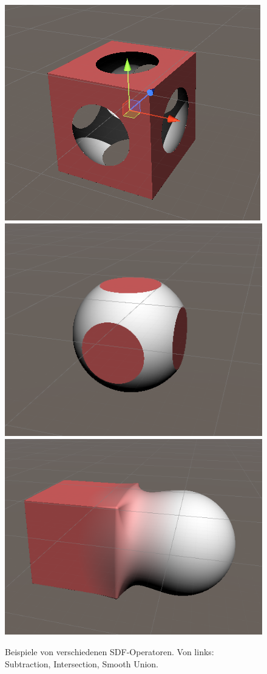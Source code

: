 \begin{figure}[!h]
	\centering
	\includegraphics[height=0.15\textheight]{Grafiken/Basics/Volume/sdf_cut.png}
	\includegraphics[height=0.15\textheight]{Grafiken/Basics/Volume/sdf_mask.png}
	\includegraphics[height=0.15\textheight]{Grafiken/Basics/Volume/sdf_union.png}
	\begin{footnotesize}
		\caption{Beispiele von verschiedenen SDF-Operatoren.
			Von links: Subtraction, Intersection, Smooth Union.}
		\label{fig:sdfOperators}
	\end{footnotesize}
\end{figure}
